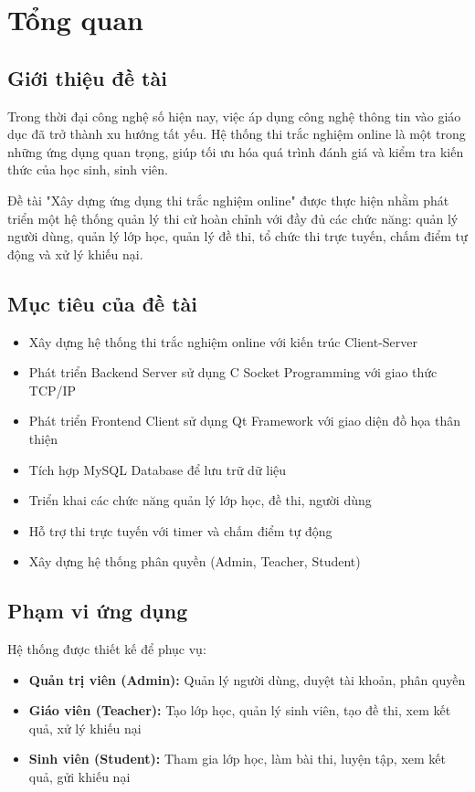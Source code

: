 \documentclass[12pt,a4paper]{report}
\begin{document}
\tableofcontents
\newpage
\listoffigures
\newpage
\listoftables

\chapter{Tổng quan}

\section{Giới thiệu đề tài}

Trong thời đại công nghệ số hiện nay, việc áp dụng công nghệ thông tin vào giáo dục đã trở thành xu hướng tất yếu. Hệ thống thi trắc nghiệm online là một trong những ứng dụng quan trọng, giúp tối ưu hóa quá trình đánh giá và kiểm tra kiến thức của học sinh, sinh viên.

Đề tài "Xây dựng ứng dụng thi trắc nghiệm online" được thực hiện nhằm phát triển một hệ thống quản lý thi cử hoàn chỉnh với đầy đủ các chức năng: quản lý người dùng, quản lý lớp học, quản lý đề thi, tổ chức thi trực tuyến, chấm điểm tự động và xử lý khiếu nại.

\section{Mục tiêu của đề tài}

\begin{itemize}
    \item Xây dựng hệ thống thi trắc nghiệm online với kiến trúc Client-Server
    \item Phát triển Backend Server sử dụng C Socket Programming với giao thức TCP/IP
    \item Phát triển Frontend Client sử dụng Qt Framework với giao diện đồ họa thân thiện
    \item Tích hợp MySQL Database để lưu trữ dữ liệu
    \item Triển khai các chức năng quản lý lớp học, đề thi, người dùng
    \item Hỗ trợ thi trực tuyến với timer và chấm điểm tự động
    \item Xây dựng hệ thống phân quyền (Admin, Teacher, Student)
\end{itemize}

\section{Phạm vi ứng dụng}

Hệ thống được thiết kế để phục vụ:
\begin{itemize}
    \item \textbf{Quản trị viên (Admin):} Quản lý người dùng, duyệt tài khoản, phân quyền
    \item \textbf{Giáo viên (Teacher):} Tạo lớp học, quản lý sinh viên, tạo đề thi, xem kết quả, xử lý khiếu nại
    \item \textbf{Sinh viên (Student):} Tham gia lớp học, làm bài thi, luyện tập, xem kết quả, gửi khiếu nại
\end{itemize}
\end{document}
